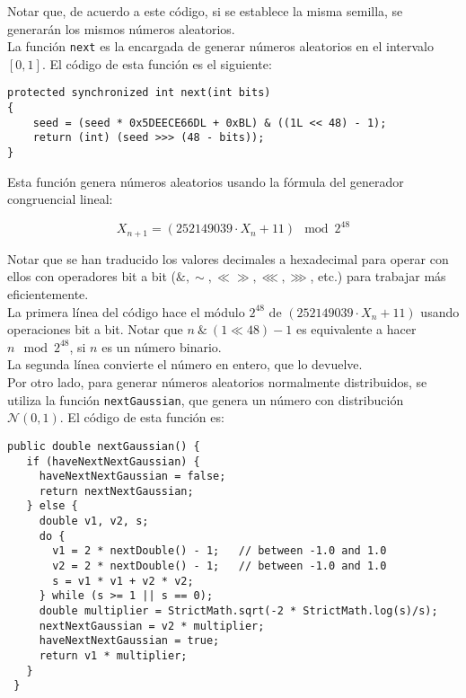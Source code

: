 \documentclass[12pt,a4paper,twoside,openright,titlepage,final]{article}
\begin{document}
Notar que, de acuerdo a este código, si se establece la misma semilla, se generarán los mismos números aleatorios.\\

La función \texttt{next} es la encargada de generar números aleatorios en el intervalo $[0,1]$. El código de esta función es el siguiente:

\begin{verbatim}
protected synchronized int next(int bits)
{
	seed = (seed * 0x5DEECE66DL + 0xBL) & ((1L << 48) - 1);
	return (int) (seed >>> (48 - bits));
}
\end{verbatim}

Esta función genera números aleatorios usando la fórmula del generador congruencial lineal:

\[ X_{n+1} = (252149039 \cdot X_n + 11) \mod 2^{48} \]

Notar que se han traducido los valores decimales a hexadecimal para operar con ellos con operadores bit a bit ($\&,\sim, \ll \gg, \lll, \ggg$, etc.) para trabajar más eficientemente.\\

La primera línea del código hace el módulo $2^{48}$ de $(252149039 \cdot X_n + 11)$ usando operaciones bit a bit. Notar que $n \ \& \ (1 \ll 48) - 1$ es equivalente a hacer $n \mod 2^{48}$, si $n$ es un número binario.\\

La segunda línea convierte el número en entero, que lo devuelve.\\

Por otro lado, para generar números aleatorios normalmente distribuidos, se utiliza la función \texttt{nextGaussian}, que genera un número con distribución $\mathcal{N}(0,1)$. El código de esta función es:

\begin{verbatim}
public double nextGaussian() {
   if (haveNextNextGaussian) {
     haveNextNextGaussian = false;
     return nextNextGaussian;
   } else {
     double v1, v2, s;
     do {
       v1 = 2 * nextDouble() - 1;   // between -1.0 and 1.0
       v2 = 2 * nextDouble() - 1;   // between -1.0 and 1.0
       s = v1 * v1 + v2 * v2;
     } while (s >= 1 || s == 0);
     double multiplier = StrictMath.sqrt(-2 * StrictMath.log(s)/s);
     nextNextGaussian = v2 * multiplier;
     haveNextNextGaussian = true;
     return v1 * multiplier;
   }
 }
\end{verbatim}
\end{document}
